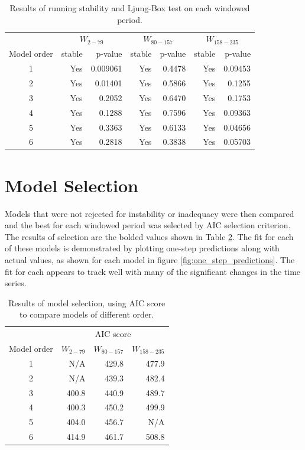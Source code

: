 \documentclass[letterpaper]{report}
\begin{document}
\begin{table}[htbp]
  \centering
  \begin{tabular}{ c | r r | r r | r r }
      & \multicolumn{2}{|c|}{$W_{2-79}$} & \multicolumn{2}{|c|}{$W_{80-157}$} & \multicolumn{2}{|c}{$W_{158-235}$} \\
    Model order & stable & p-value & stable & p-value & stable & p-value \\
    \hline
    1 & Yes & 0.009061 & Yes & 0.4478 & Yes & 0.09453 \\
    2 & Yes & 0.01401 & Yes & 0.5866 & Yes & 0.1255 \\
    3 & Yes & 0.2052 & Yes & 0.6470 & Yes & 0.1753 \\
    4 & Yes & 0.1288 & Yes & 0.7596 & Yes & 0.09363 \\ 
    5 & Yes & 0.3363 & Yes & 0.6133 & Yes & 0.04656 \\
    6 & Yes & 0.2818 & Yes & 0.3838 & Yes & 0.05703 \\
    \hline
  \end{tabular}
\caption[Diagnostic test results]{Results of running stability and Ljung-Box test on each windowed period.}
\label{tab:diagnostic_results}
\end{table}

\section*{Model Selection}
Models that were not rejected for instability or inadequacy were then compared and the best for each windowed period was selected by AIC selection criterion. The results of selection are the bolded values shown in Table \ref{tab:selection_results}. The fit for each of these models is demonstrated by plotting one-step predictions along with actual values, as shown for each model in figure \ref{fig:one_step_predictions}. The fit for each appears to track well with many of the significant changes in the time series.

\begin{table}[htbp]
  \centering
  \begin{tabular}{ c | r | r | r }
    ~ & \multicolumn{3}{|c}{AIC score} \\
    Model order & $W_{2-79}$ & $W_{80-157}$ & $W_{158-235}$ \\
    \hline
    1 & N/A & 429.8 & 477.9 \\
    2 & N/A & 439.3 & 482.4 \\
    3 & 400.8 & 440.9 & 489.7 \\
    4 & 400.3 & 450.2 & 499.9 \\ 
    5 & 404.0 & 456.7 & N/A \\
    6 & 414.9 & 461.7 & 508.8 \\
    \hline
  \end{tabular}
\caption[Model selection results]{Results of model selection, using AIC score to compare models of different order.}
\label{tab:selection_results}
\end{table}
\end{document}
